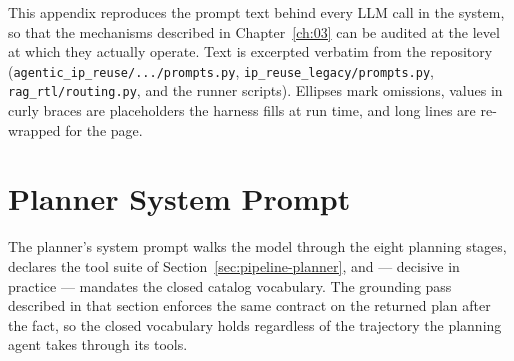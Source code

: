 
\label{app:prompts}

This appendix reproduces the prompt text behind every LLM call in the
system, so that the mechanisms described in
Chapter~\ref{ch:03} can be audited at the level at which they actually
operate. Text is excerpted verbatim from the repository
(\texttt{agentic\_ip\_reuse/.../prompts.py},
\texttt{ip\_reuse\_legacy/prompts.py}, \texttt{rag\_rtl/routing.py}, and
the runner scripts). Ellipses mark omissions, values in curly braces are
placeholders the harness fills at run time, and long lines are re-wrapped
for the page.

\section{Planner System Prompt}
\label{app:planner-system}

The planner's system prompt walks the model through the eight planning
stages, declares the tool suite of
Section~\ref{sec:pipeline-planner}, and --- decisive in practice ---
mandates the closed catalog vocabulary. The grounding pass described in
that section enforces the same contract on the returned plan after the
fact, so the closed vocabulary holds regardless of the trajectory the
planning agent takes through its tools.

